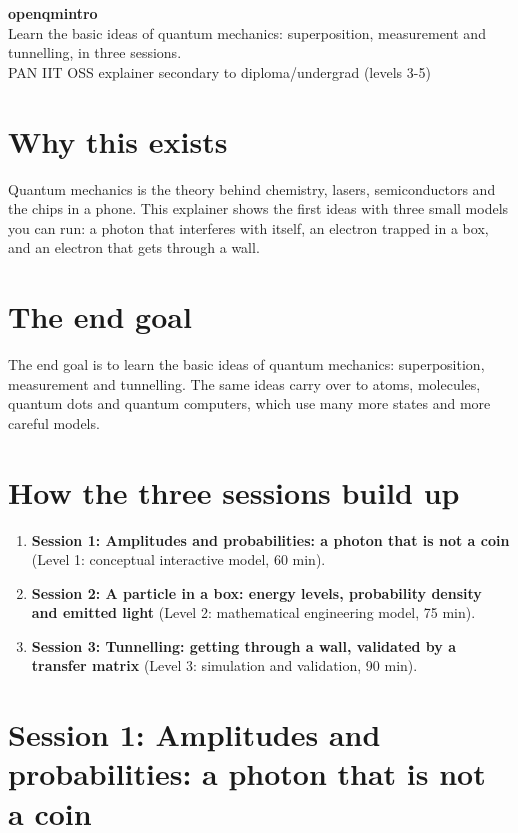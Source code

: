 \documentclass[11pt,a4paper]{article}
\begin{document}
\begin{center}{\LARGE\bfseries openqmintro}\\[0.4em]{\large Learn the basic ideas of quantum mechanics: superposition, measurement and tunnelling, in three sessions.}\\[0.2em]\small PAN IIT OSS explainer \textbullet{} secondary to diploma/undergrad (levels 3-5)\end{center}

\section*{Why this exists}
Quantum mechanics is the theory behind chemistry, lasers, semiconductors and the chips in a phone. This explainer shows the first ideas with three small models you can run: a photon that interferes with itself, an electron trapped in a box, and an electron that gets through a wall.

\section*{The end goal}
The end goal is to learn the basic ideas of quantum mechanics: superposition, measurement and tunnelling. The same ideas carry over to atoms, molecules, quantum dots and quantum computers, which use many more states and more careful models.

\section*{How the three sessions build up}
\begin{enumerate}[nosep]
\item \textbf{Session 1: Amplitudes and probabilities: a photon that is not a coin} (Level 1: conceptual interactive model, 60 min).
\item \textbf{Session 2: A particle in a box: energy levels, probability density and emitted light} (Level 2: mathematical engineering model, 75 min).
\item \textbf{Session 3: Tunnelling: getting through a wall, validated by a transfer matrix} (Level 3: simulation and validation, 90 min).
\end{enumerate}

\section{Session 1: Amplitudes and probabilities: a photon that is not a coin}
\end{document}
